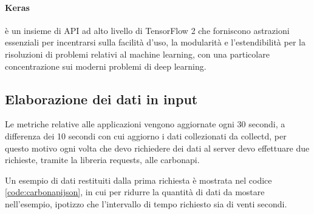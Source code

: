 \paragraph{Keras} è un insieme di API ad alto livello di TensorFlow 2 che forniscono astrazioni essenziali per incentrarsi sulla facilità d'uso, la modularità e l'estendibilità per la risoluzioni di problemi relativi al machine learning, con una particolare concentrazione sui moderni problemi di deep learning.


\subsection{Elaborazione dei dati in input}


Le metriche relative alle applicazioni vengono aggiornate ogni 30 secondi, a differenza dei 10 secondi con cui aggiorno i dati collezionati da collectd, per questo motivo ogni volta che devo richiedere dei dati al server devo effettuare due richieste, tramite la libreria requests, alle carbonapi.


Un esempio di dati restituiti dalla prima richiesta è mostrata nel codice \ref{code:carbonapijson}, in cui per ridurre la quantità di dati da mostare nell'esempio, ipotizzo che l'intervallo di tempo richiesto sia di venti secondi.

